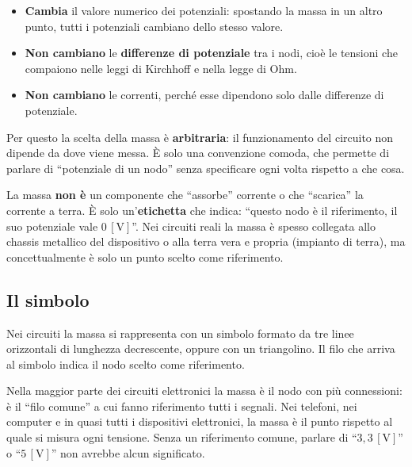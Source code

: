 \begin{itemize}[leftmargin=1cm]
  \item \textbf{Cambia} il valore numerico dei potenziali: spostando la massa in un altro punto, tutti i potenziali cambiano dello stesso valore.
  \item \textbf{Non cambiano} le \textbf{differenze di potenziale} tra i nodi, cioè le tensioni che compaiono nelle leggi di Kirchhoff e nella legge di Ohm.
  \item \textbf{Non cambiano} le correnti, perché esse dipendono solo dalle differenze di potenziale.
\end{itemize}

Per questo la scelta della massa è \textbf{arbitraria}: il funzionamento del circuito non dipende da dove viene messa. È solo una convenzione comoda, che permette di parlare di ``potenziale di un nodo'' senza specificare ogni volta rispetto a che cosa.

\begin{attenzione}
La massa \textbf{non è} un componente che ``assorbe'' corrente o che ``scarica'' la corrente a terra. È solo un'\textbf{etichetta} che indica: ``questo nodo è il riferimento, il suo potenziale vale \(0\,[\text{V}]\)''. Nei circuiti reali la massa è spesso collegata allo chassis metallico del dispositivo o alla terra vera e propria (impianto di terra), ma concettualmente è solo un punto scelto come riferimento.
\end{attenzione}

\subsection{Il simbolo}

Nei circuiti la massa si rappresenta con un simbolo formato da tre linee orizzontali di lunghezza decrescente, oppure con un triangolino. Il filo che arriva al simbolo indica il nodo scelto come riferimento.

\begin{center}
\end{center}


\begin{curiosita}
Nella maggior parte dei circuiti elettronici la massa è il nodo con più connessioni: è il ``filo comune'' a cui fanno riferimento tutti i segnali. Nei telefoni, nei computer e in quasi tutti i dispositivi elettronici, la massa è il punto rispetto al quale si misura ogni tensione. Senza un riferimento comune, parlare di ``\(3{,}3\,[\text{V}]\)'' o ``\(5\,[\text{V}]\)'' non avrebbe alcun significato.
\end{curiosita}

















